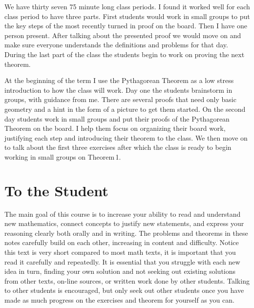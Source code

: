 \begin{annotation}
We have thirty seven 75 minute long class periods. I found it worked well for each class period to have three parts.  First students would work in small groups to put the key steps of the most recently turned in proof on the board. Then I have one person present. After talking about the presented proof we would move on and make sure everyone understands the definitions and problems for that day. During the last part of the class the students begin to work on proving the next theorem. 

At the beginning of the term I use the Pythagorean Theorem as a low stress introduction to how the class will work. Day one the students brainstorm in groups, with guidance from me. There are several proofs that need only basic geometry and a hint in the form of a picture to get them started.  On the second day students work in small groups and put their proofs of the Pythagorean Theorem on the board.  I help them focus on organizing their board work, justifying each step and introducing their theorem to the class. We then move on to talk about the first three exercises after which the class is ready to begin working in small groups on Theorem\,1.




\end{annotation}



\chapter{ To the Student}

The main goal of this course is to increase your ability to read and understand new mathematics, connect concepts to justify new statements, and express your reasoning clearly both orally and in writing.  The problems and theorems in these notes carefully build on each other, increasing in content and difficulty. Notice this text is very short compared to most math texts, it is important that you read it carefully and repeatedly.  It is essential that you struggle with each new idea in turn, finding your own solution and not seeking out existing solutions from other texts, on-line sources, or written work done by other students. Talking to other students is encouraged, but only seek out other students once you have made as much progress on the exercises and theorem for yourself as you can. 



